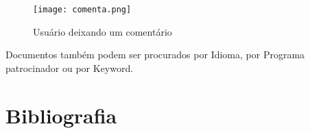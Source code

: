 \documentclass[12pt,a4paper]{article}
\begin{document}
\begin{figure}[h]
  \centering
    \texttt{[image: comenta.png]}
    \caption{Usuário deixando um comentário}
    \label{fig:comenta}
\end{figure}

Documentos também podem ser procurados por Idioma, por Programa patrocinador ou por Keyword.

\section{Bibliografia}

\nocite{elmasri}
\nocite{indiano}



\end{document}
